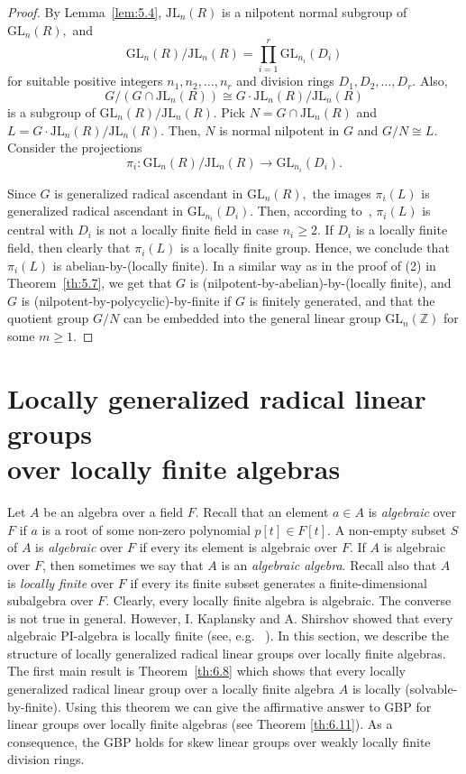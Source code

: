 \documentclass{amsart}
\theoremstyle{definition}
\begin{document}
\begin{proof} By Lemma~\ref{lem:5.4}, $\mathrm{JL}_n(R)$ is a nilpotent normal subgroup of $\mathrm{GL}_n(R),$ and $$\mathrm{GL}_n(R)/\mathrm{JL}_n(R)= \prod_{i=1}^{r}\mathrm{GL}_{n_i}(D_i)$$ for suitable positive integers $n_1, n_2,\ldots, n_r$ and division rings $D_1, D_2,\ldots, D_r.$ Also, $$G/(G\cap \mathrm{JL}_n(R))\cong G\cdot\mathrm{JL}_n(R)/\mathrm{JL}_n(R)$$ is a subgroup of $\mathrm{GL}_n(R)/\mathrm{JL}_n(R).$ Pick $N=G\cap \mathrm{JL}_n(R)$ and $L=G\cdot\mathrm{JL}_n(R)/\mathrm{JL}_n(R).$ Then, $N$ is normal nilpotent in $G$ and $G/N\cong L.$ Consider the projections $$\pi_i: \mathrm{GL}_n(R)/\mathrm{JL}_n(R)\longrightarrow \mathrm{GL}_{n_i}(D_i).$$ 	
	
Since $G$ is generalized radical ascendant in $\mathrm{GL}_n(R),$ the images $\pi_i(L)$ is generalized radical ascendant in $\mathrm{GL}_{n_i}(D_i).$ Then, according to~\cite[Theorem 3.8]{Pa_ChuaHai_2026}, $\pi_i(L)$ is central with $D_i$ is not a locally finite field in case $n_i\geq 2.$ If $D_i$ is a locally finite field, then clearly that $\pi_i(L)$ is a locally finite group. Hence, we conclude that $\pi_i(L)$ is abelian-by-(locally finite). In a similar way as in the proof of (2) in Theorem~\ref{th:5.7}, we get that $G$ is (nilpotent-by-abelian)-by-(locally finite), and $G$ is (nilpotent-by-polycyclic)-by-finite if $G$ is finitely generated, and that the quotient group $G/N$ can be embedded into the general linear group $\mathrm{GL}_n(\mathbb{Z})$ for some $m\geq 1.$
\end{proof}
\section{Locally generalized radical linear groups\\ over locally finite algebras}\label{S6}

Let $A$ be an algebra over a field $F$. Recall that an element $a\in A$ is \textit{algebraic} over $F$ if $a$ is a root of some non-zero polynomial $p[t]\in F[t]$. A non-empty subset $S$ of $A$ is \textit{algebraic} over $F$ if every its element is algebraic over $F$. If $A$ is algebraic over $F$, then sometimes we say that $A$ is an \textit{algebraic algebra}. Recall also that $A$ is \textit{locally finite} over $F$ if every its finite subset generates a finite-dimensional subalgebra over $F.$ Clearly, every locally finite algebra is algebraic. The converse is not true in general. However, I. Kaplansky and A. Shirshov showed that every algebraic $\mathrm{PI}$-algebra is locally finite (see, e.g. ~\cite[Ch.~10, \S12, Theorem 1]{Bo_Jacobson_1964}). In this section, we describe the structure of locally generalized radical linear groups over locally finite algebras. The first main result is Theorem~\ref{th:6.8} which shows that every locally generalized radical linear group over a locally finite algebra $A$ is locally (solvable-by-finite). Using this theorem we can give the affirmative answer to GBP for linear groups over locally finite algebras (see Theorem \ref{th:6.11}). As a consequence, the GBP holds for skew linear groups over weakly locally finite division rings.
\end{document}
